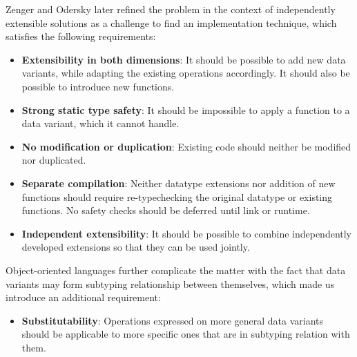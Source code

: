Zenger and Odersky later refined the problem in the context of independently 
extensible solutions\cite{fool12} as a challenge to find an implementation 
technique, which satisfies the following requirements:

\begin{itemize}
\setlength{\itemsep}{0pt}
\setlength{\parskip}{0pt}
\item {\bf Extensibility in both dimensions}: It should be possible to add new 
      data variants, while adapting the existing operations accordingly. It 
      should also be possible to introduce new functions. 
\item {\bf Strong static type safety}: It should be impossible to apply a 
      function to a data variant, which it cannot handle. 
\item {\bf No modification or duplication}: Existing code should neither be 
      modified nor duplicated.
\item {\bf Separate compilation}: Neither datatype extensions nor addition of 
      new functions should require re-typechecking the original datatype or 
      existing functions. No safety checks should be deferred until link or 
      runtime.
\item {\bf Independent extensibility}: It should be possible to combine 
      independently developed extensions so that they can be used jointly.
\end{itemize}


\noindent
Object-oriented languages further complicate the matter with the fact that 
data variants may form subtyping relationship between themselves, which made us 
introduce an additional requirement:

\begin{itemize}
\setlength{\itemsep}{0pt}
\setlength{\parskip}{0pt}
\item {\bf Substitutability}: Operations expressed on more general data variants
      should be applicable to more specific ones that are in subtyping relation 
      with them.
\end{itemize}


